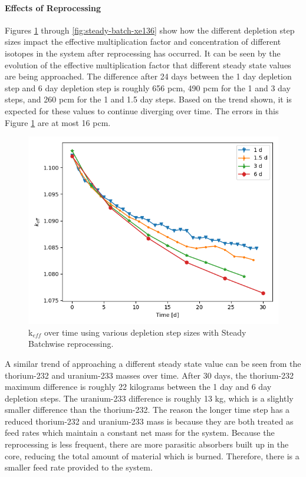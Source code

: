 \paragraph*{Effects of Reprocessing}

Figures \ref{fig:steady-batch-k} through \ref{fig:steady-batch-xe136} show how the different depletion step sizes impact the effective multiplication factor and concentration of different isotopes in the system after reprocessing has occurred.
It can be seen by the evolution of the effective multiplication factor that different steady state values are being approached. The difference after 24 days between the 1 day depletion step and 6 day depletion step is roughly 656 pcm, 490 pcm for the 1 and 3 day steps, and 260 pcm for the 1 and 1.5 day steps. Based on the trend shown, it is expected for these values to continue diverging over time. The errors in this Figure \ref{fig:steady-batch-k} are at most 16 pcm.


\begin{figure}[H]
  \centering
  \includegraphics[scale=0.7]{images/keff-batch-dep-refine.png}
  \caption{k$_{eff}$ over time using various depletion step sizes with Steady Batchwise reprocessing.}
   \label{fig:steady-batch-k}
\end{figure}

A similar trend of approaching a different steady state value can be seen from the thorium-232 and uranium-233 masses over time. After 30 days, the thorium-232 maximum difference is roughly 22 kilograms between the 1 day and 6 day depletion steps. The uranium-233 difference is roughly 13 kg, which is a slightly smaller difference than the thorium-232. The reason the longer time step has a reduced thorium-232 and uranium-233 mass is because they are both treated as feed rates which maintain a constant net mass for the system. Because the reprocessing is less frequent, there are more parasitic absorbers built up in the core, reducing the total amount of material which is burned. Therefore, there is a smaller feed rate provided to the system.

